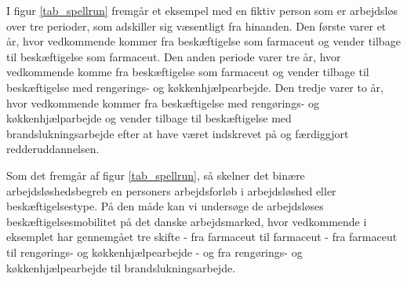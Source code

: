 I figur \ref{tab_spellrun} fremgår et eksempel med en fiktiv person som er arbejdsløs over tre perioder, som adskiller sig væsentligt fra hinanden. Den første varer et år, hvor vedkommende kommer fra beskæftigelse som farmaceut og vender tilbage til beskæftigelse som farmaceut. Den anden periode varer tre år, hvor vedkommende komme fra beskæftigelse som farmaceut og vender tilbage til beskæftigelse med rengørings- og køkkenhjælpearbejde. Den tredje varer to år, hvor vedkommende kommer fra beskæftigelse med rengørings- og køkkenhjælparbejde og vender tilbage til beskæftigelse med brandslukningsarbejde efter at have været indskrevet på og færdiggjort redderuddannelsen.
% 
\begin{table}[H]
\centering
\caption{Eksempel på datastruktur. Kilde: DST}
\label{tab_spellrun}
\end{table}
% 
Som det fremgår af figur \ref{tab_spellrun}, så skelner det binære arbejdsløshedsbegreb en personers arbejdsforløb i arbejdsløshed eller beskæftigelsestype. På den måde kan vi undersøge de arbejdsløses beskæftigelsesmobilitet på det danske arbejdsmarked, hvor vedkommende i eksemplet har gennemgået tre skifte - fra farmaceut til farmaceut - fra farmaceut til rengørings- og køkkenhjælpearbejde - og fra rengørings- og køkkenhjælpearbejde til brandslukningsarbejde.




